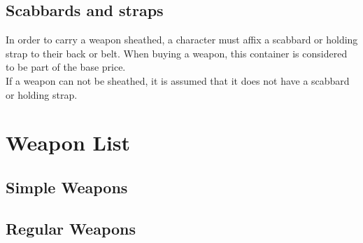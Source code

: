 \subsection{Scabbards and straps}\label{subsec:scabbards}
In order to carry a weapon sheathed, a character must affix a scabbard or holding strap to their back or belt.
When buying a weapon, this container is considered to be part of the base price.\\
If a weapon can not be sheathed, it is assumed that it does not have a scabbard or holding strap.

\section{Weapon List}\label{sec:weaponList}
\subsection{Simple Weapons}\label{subsec:simpleWeapons}






























\subsection{Regular Weapons}\label{subsec:regularWeapons}

